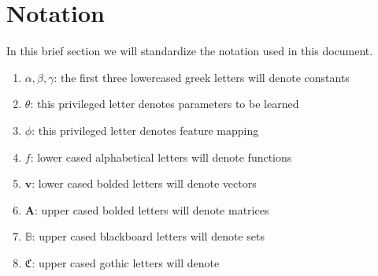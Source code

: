 \section{Notation}


In this brief section we will standardize the notation used in this document. 

\begin{enumerate}[label={}]
	\item $\alpha, \beta, \gamma$: the first three lowercased greek letters will denote constants
	\item $\theta$: this privileged letter denotes parameters to be learned 
	\item $\phi$: this privileged letter denotes feature mapping		
	\item $f$: lower cased alphabetical letters will denote functions
	\item $\pmb{v}$: lower cased bolded letters will denote vectors
	\item $\pmb{A}$: upper cased bolded letters will denote matrices
	\item $\mathbb{B}$: upper cased blackboard letters will denote sets
	\item $\mathfrak{C}$: upper cased gothic letters will denote 
\end{enumerate}

